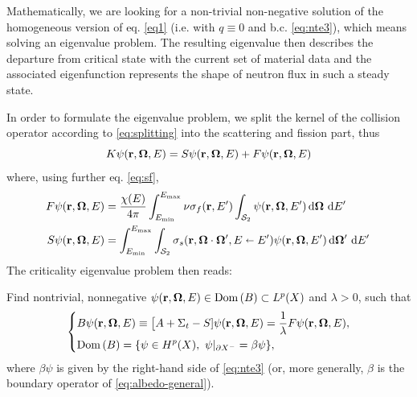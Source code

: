 Mathematically, we are looking for a non-trivial non-negative solution of the homogeneous
version of eq. \eqref{eq1} (i.e. with $q\equiv 0$ and b.c. \eqref{eq:nte3}), which means solving an eigenvalue
problem. The resulting eigenvalue then describes the departure from critical state with the current set of material
data and the associated eigenfunction represents the shape of neutron flux in such a steady state. 

In order to formulate
the eigenvalue problem, we split the kernel of the collision operator according to \eqref{eq:splitting} into the 
scattering and fission part, thus
$$
K\psi(\br,\bomega,E)
  			= S\psi(\br,\bomega,E) + F\psi(\br,\bomega,E)
$$
where, using further eq. \eqref{eq:sf},
\begin{equation}\label{eq:FScrit}
\begin{aligned}
F\psi(\br,\bomega,E) &= \frac{\chi(E)}{4\pi}\intE[']{\Emin}{\Emax}{\nu\sigma_f(\br,E')\intA{\psi(\br,\bomega,E')}}\\
S\psi(\br,\bomega,E) &= \intE[']{\Emin}{\Emax}{\intA[']{\sigma_s(\br,\bomega\cdot\bomega',E\sla
E')\psi(\br,\bomega,E')}}
\end{aligned}
\end{equation}
The criticality eigenvalue problem then reads:
\begin{problem}
Find nontrivial, nonnegative $\psi(\br,\bomega,E)\in \Dom{B} \subset \Lp(X)$ and $\lambda > 0$, such that
\begin{equation}\label{eq:critical}
\left\{
  \begin{aligned}
     &B\psi(\br,\bomega,E) \equiv \bigl[A + \Sigma_t - S]\psi(\br,\bomega,E) = \frac{1}{\lambda} F\psi(\br,\bomega,E),\\
     &\Dom{B} = \{\psi\in \Hp(X),\ \psi\vert_{\pX[-]} = \beta\psi\},
  \end{aligned}
\right.
\end{equation}
where $\beta\psi$ is given by the right-hand side of \eqref{eq:nte3} (or, more generally, $\beta$ is the
boundary operator of \eqref{eq:albedo-general}).
\end{problem}  

